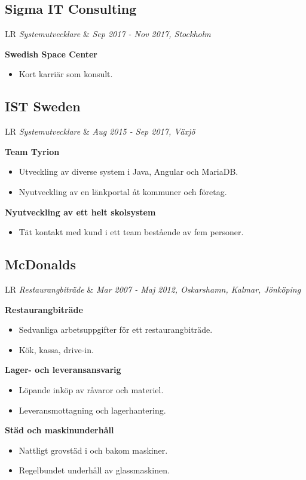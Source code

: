 \documentclass[11pt,a4paper]{moderncv}
\newcommand*{\experienceentry}[5][1.5mm]{
    \subsection{#2} \vspace{-1.5mm}
    \begin{tabularx}{\textwidth}{LR}
        {\itshape #3} & {\itshape #4, #5}
    \end{tabularx}
    \par\addvspace{#1}
}
\begin{document}
\begin{minipage}[t]{0.62\textwidth}
\experienceentry{Sigma IT Consulting}{Systemutvecklare}{Sep 2017 - Nov 2017}{Stockholm}
\textbf{Swedish Space Center}
\begin{itemize}
  \item Kort karriär som konsult.
\end{itemize}
\vspace{2.0mm}

\experienceentry{IST Sweden}{Systemutvecklare}{Aug 2015 - Sep 2017}{Växjö}

\textbf{Team Tyrion}
\begin{itemize}
    \item Utveckling av diverse system i Java, Angular och MariaDB.
    \item Nyutveckling av en länkportal åt kommuner och företag.
\end{itemize}
\vspace{1.0mm}

\textbf{Nyutveckling av ett helt skolsystem}
\begin{itemize}
    \item Tät kontakt med kund i ett team bestående av fem personer.
\end{itemize}
\vspace{2.0mm}

\experienceentry{McDonalds}{Restaurangbiträde}{Mar 2007 - Maj 2012}{Oskarshamn, Kalmar, Jönköping}
\vspace{-4.0mm}
\textbf{Restaurangbiträde}
\begin{itemize}
  \item Sedvanliga arbetsuppgifter för ett restaurangbiträde.
  \item Kök, kassa, drive-in.
\end{itemize}

\textbf{Lager- och leveransansvarig}
\begin{itemize}
  \item Löpande inköp av råvaror och materiel.
  \item Leveransmottagning och lagerhantering.
\end{itemize}

\textbf{Städ och maskinunderhåll}
\begin{itemize}
  \item Nattligt grovstäd i och bakom maskiner.
  \item Regelbundet underhåll av glassmaskinen.
\end{itemize}

\end{minipage}
\hfill
\end{document}
